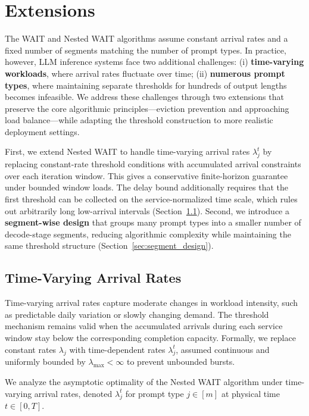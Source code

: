 \section{Extensions}\label{sec:extension}

The WAIT and Nested WAIT algorithms assume constant arrival rates and a fixed number of segments matching the number of prompt types. In practice, however, LLM inference systems face two additional challenges: (i) \textbf{time-varying workloads}, where arrival rates fluctuate over time; (ii) \textbf{numerous prompt types}, where maintaining separate thresholds for hundreds of output lengths becomes infeasible. We address these challenges through two extensions that preserve the core algorithmic principles---eviction prevention and approaching load balance---while adapting the threshold construction to more realistic deployment settings.

First, we extend Nested WAIT to handle time-varying arrival rates $\lambda_j^t$ by replacing constant-rate threshold conditions with accumulated arrival constraints over each iteration window. This gives a conservative finite-horizon guarantee under bounded window loads. The delay bound additionally requires that the first threshold can be collected on the service-normalized time scale, which rules out arbitrarily long low-arrival intervals (Section~\ref{sec:time_varying}). Second, we introduce a \textbf{segment-wise design} that groups many prompt types into a smaller number of decode-stage segments, reducing algorithmic complexity while maintaining the same threshold structure (Section~\ref{sec:segment_design}).

\subsection{Time-Varying Arrival Rates}\label{sec:time_varying}

Time-varying arrival rates capture moderate changes in workload intensity, such as predictable daily variation or slowly changing demand. The threshold mechanism remains valid when the accumulated arrivals during each service window stay below the corresponding completion capacity. Formally, we replace constant rates $\lambda_j$ with time-dependent rates $\lambda_j^t$, assumed continuous and uniformly bounded by $\lambda_{\max} < \infty$ to prevent unbounded bursts.

We analyze the asymptotic optimality of the Nested WAIT algorithm under time-varying arrival rates, denoted $\lambda_j^t$ for prompt type $j \in [m]$ at physical time $t \in [0, T]$.

